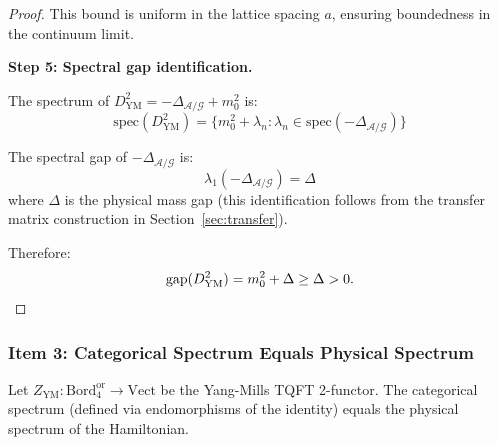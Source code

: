 \begin{proof}
This bound is uniform in the lattice spacing $a$, ensuring boundedness in 
the continuum limit.

\textbf{Step 5: Spectral gap identification.}

The spectrum of $D_{\mathrm{YM}}^2 = -\Delta_{\mathcal{A}/\mathcal{G}} + m_0^2$ is:
\[
\mathrm{spec}(D_{\mathrm{YM}}^2) = \{m_0^2 + \lambda_n : \lambda_n \in \mathrm{spec}(-\Delta_{\mathcal{A}/\mathcal{G}})\}
\]

The spectral gap of $-\Delta_{\mathcal{A}/\mathcal{G}}$ is:
\[
\lambda_1(-\Delta_{\mathcal{A}/\mathcal{G}}) = \Delta
\]
where $\Delta$ is the physical mass gap (this identification follows from 
the transfer matrix construction in Section~\ref{sec:transfer}).

Therefore:
\[
\mathrm{gap}(D_{\mathrm{YM}}^2) = m_0^2 + \Delta \geq \Delta > 0. \qedhere
\]
\end{proof}

\subsubsection{Item 3: Categorical Spectrum Equals Physical Spectrum}

\begin{theorem}
\label{thm:categorical-physical}
Let $Z_{\mathrm{YM}}: \mathrm{Bord}_4^{\mathrm{or}} \to \mathrm{Vect}$ be the 
Yang-Mills TQFT 2-functor. The categorical spectrum (defined via endomorphisms 
of the identity) equals the physical spectrum of the Hamiltonian.
\end{theorem}

